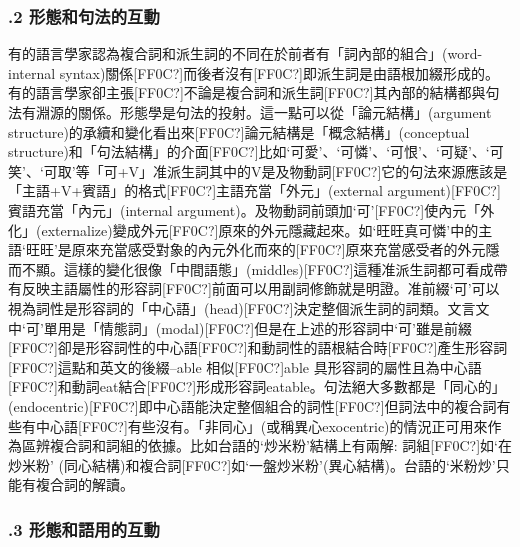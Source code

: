 \subsubsection{.2 形態和句法的互動}

\textrm{有的語言學家認為複合詞和派生詞的不同在於前者有「詞內部的組合」(word-internal syntax)關係[FF0C?]而後者沒有[FF0C?]即派生詞是由語根加綴形成的。有的語言學家卻主張[FF0C?]不論是複合詞和派生詞[FF0C?]其內部的結構都與句法有淵源的關係。形態學是句法的投射。這一點可以從「論元結構」(argument structure)的承續和變化看出來[FF0C?]論元結構是「概念結構」(conceptual structure)和「句法結構」的介面[FF0C?]比如‘可愛’}、\textrm{‘可憐’}、\textrm{‘可恨’}、\textrm{‘可疑’}、\textrm{‘可笑’}、\textrm{‘可取’等「可+V」准派生詞其中的V是及物動詞[FF0C?]它的句法來源應該是「主語+V+賓語」的格式[FF0C?]主語充當「外元」(external argument)}[FF0C?]\textrm{賓語充當「內元」(internal argument)}。\textrm{及物動詞前頭加‘可’}[FF0C?]\textrm{使內元「外化」(externalize)變成外元[FF0C?]原來的外元隱藏起來。如‘旺旺真可憐’中的主語‘旺旺’是原來充當感受對象的內元外化而來的[FF0C?]原來充當感受者的外元隱而不顯。這樣的變化很像「中間語態」(middles)}[FF0C?]\textrm{這種准派生詞都可看成帶有反映主語屬性的形容詞[FF0C?]前面可以用副詞修飾就是明證。准前綴‘可’可以視為詞性是形容詞的「中心語」(head)}[FF0C?]\textrm{決定整個派生詞的詞類。文言文中‘可’單用是「情態詞」(modal)}[FF0C?]\textrm{但是在上述的形容詞中‘可’雖是前綴[FF0C?]卻是形容詞性的中心語[FF0C?]和動詞性的語根結合時[FF0C?]產生形容詞[FF0C?]這點和英文的後綴–able 相似[FF0C?]able 具形容詞的屬性且為中心語[FF0C?]和動詞eat結合[FF0C?]形成形容詞eatable}。\textrm{句法絕大多數都是「同心的」(endocentric)}[FF0C?]\textrm{即中心語能決定整個組合的詞性[FF0C?]但詞法中的複合詞有些有中心語[FF0C?]有些沒有。「非同心」(或稱異心exocentric)的情況正可用來作為區辨複合詞和詞組的依據。比如台語的‘炒米粉’結構上有兩解: 詞組[FF0C?]如‘在炒米粉’ (同心結構)和複合詞[FF0C?]如‘一盤炒米粉’(異心結構)}。\textrm{台語的‘米粉炒’只能有複合詞的解讀。}

\subsubsection{.3 形態和語用的互動}

